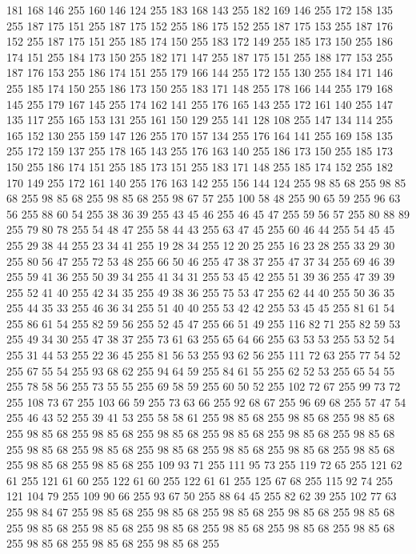 181 168 146 255 160 146 124 255 183 168 143 255 182 169 146 255 172 158 135 255 187 175 151 255 187 175 152 255 186 175 152 255 187 175 153 255 187 176 152 255 187 175 151 255 185 174 150 255 183 172 149 255 185 173 150 255 186 174 151 255 184 173 150 255 182 171 147 255 187 175 151 255 188 177 153 255 187 176 153 255 186 174 151 255 179 166 144 255 172 155 130 255 184 171 146 255 185 174 150 255 186 173 150 255 183 171 148 255 178 166 144 255 179 168 145 255 179 167 145 255 174 162 141 255 176 165 143 255 172 161 140 255 147 135 117 255 165 153 131 255 161 150 129 255 141 128 108 255 147 134 114 255 165 152 130 255 159 147 126 255 170 157 134 255 176 164 141 255 169 158 135 255 172 159 137 255 178 165 143 255 176 163 140 255 186 173 150 255 185 173 150 255 186 174 151 255 185 173 151 255 183 171 148 255 185 174 152 255 182 170 149 255 172 161 140 255 176 163 142 255 156 144 124 255 98 85 68 255 98 85 68 255 98 85 68 255 98 85 68 255 98 67 57 255 100 58 48 255 90 65 59 255 96 63 56 255
88 60 54 255 38 36 39 255 43 45 46 255 46 45 47 255 59 56 57 255 80 88 89 255 79 80 78 255 54 48 47 255 58 44 43 255 63 47 45 255 60 46 44 255 54 45 45 255 29 38 44 255 23 34 41 255 19 28 34 255 12 20 25 255 16 23 28 255 33 29 30 255 80 56 47 255 72 53 48 255 66 50 46 255 47 38 37 255 47 37 34 255 69 46 39 255 59 41 36 255 50 39 34 255 41 34 31 255 53 45 42 255 51 39 36 255 47 39 39 255 52 41 40 255 42 34 35 255 49 38 36 255 75 53 47 255 62 44 40 255 50 36 35 255 44 35 33 255 46 36 34 255 51 40 40 255 53 42 42 255 53 45 45 255 81 61 54 255 86 61 54 255 82 59 56 255 52 45 47 255 66 51 49 255 116 82 71 255 82 59 53 255 49 34 30 255 47 38 37 255 73 61 63 255 65 64 66 255 63 53 53 255 53 52 54 255 31 44 53 255 22 36 45 255 81 56 53 255 93 62 56 255 111 72 63 255 77 54 52 255 67 55 54 255 93 68 62 255 94 64 59 255 84 61 55 255
62 52 53 255 65 54 55 255 78 58 56 255 73 55 55 255 69 58 59 255 60 50 52 255 102 72 67 255 99 73 72 255 108 73 67 255 103 66 59 255 73 63 66 255 92 68 67 255 96 69 68 255 57 47 54 255 46 43 52 255 39 41 53 255 58 58 61 255 98 85 68 255 98 85 68 255 98 85 68 255 98 85 68 255 98 85 68 255 98 85 68 255 98 85 68 255 98 85 68 255 98 85 68 255 98 85 68 255 98 85 68 255 98 85 68 255 98 85 68 255 98 85 68 255 98 85 68 255 98 85 68 255 98 85 68 255 109 93 71 255 111 95 73 255 119 72 65 255 121 62 61 255 121 61 60 255 122 61 60 255 122 61 61 255 125 67 68 255 115 92 74 255 121 104 79 255 109 90 66 255 93 67 50 255 88 64 45 255 82 62 39 255 102 77 63 255 98 84 67 255 98 85 68 255 98 85 68 255 98 85 68 255 98 85 68 255 98 85 68 255 98 85 68 255 98 85 68 255 98 85 68 255 98 85 68 255 98 85 68 255 98 85 68 255 98 85 68 255 98 85 68 255 98 85 68 255
